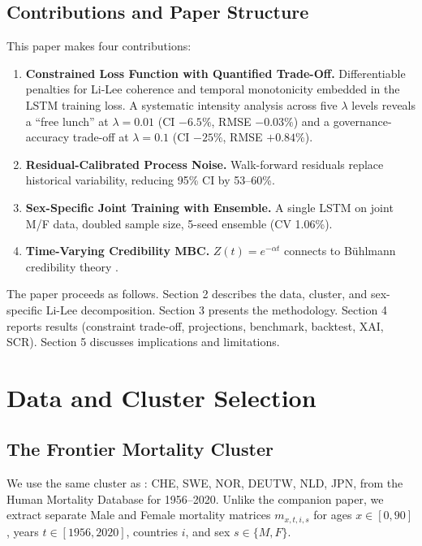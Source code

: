 \documentclass[11pt,a4paper]{article}
\begin{document}
\subsection{Contributions and Paper Structure}

This paper makes four contributions:
\begin{enumerate}
    \item \textbf{Constrained Loss Function with Quantified Trade-Off.} Differentiable penalties for Li-Lee coherence and temporal monotonicity embedded in the LSTM training loss. A systematic intensity analysis across five $\lambda$ levels reveals a ``free lunch'' at $\lambda = 0.01$ (CI $-6.5\%$, RMSE $-0.03\%$) and a governance-accuracy trade-off at $\lambda = 0.1$ (CI $-25\%$, RMSE $+0.84\%$).
    \item \textbf{Residual-Calibrated Process Noise.} Walk-forward residuals replace historical variability, reducing 95\% CI by 53--60\%.
    \item \textbf{Sex-Specific Joint Training with Ensemble.} A single LSTM on joint M/F data, doubled sample size, 5-seed ensemble (CV 1.06\%).
    \item \textbf{Time-Varying Credibility MBC.} $Z(t) = e^{-\alpha t}$ connects to B\"uhlmann credibility theory \cite{buhlmann1967}.
\end{enumerate}

The paper proceeds as follows. Section 2 describes the data, cluster, and sex-specific Li-Lee decomposition. Section 3 presents the methodology. Section 4 reports results (constraint trade-off, projections, benchmark, backtest, XAI, SCR). Section 5 discusses implications and limitations.

\section{Data and Cluster Selection}

\subsection{The Frontier Mortality Cluster}

We use the same cluster as \cite{rindori2026p04}: CHE, SWE, NOR, DEUTW, NLD, JPN, from the Human Mortality Database \cite{hmd2023} for 1956--2020. Unlike the companion paper, we extract separate Male and Female mortality matrices $m_{x,t,i,s}$ for ages $x \in [0, 90]$, years $t \in [1956, 2020]$, countries $i$, and sex $s \in \{M, F\}$.
\end{document}
